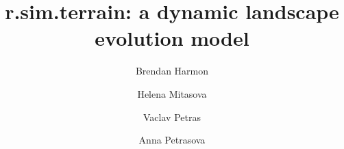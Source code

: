 \documentclass[final,3p,times,twocolumn]{elsarticle}
\begin{document}
\begin{frontmatter}

\title{\lowercase{r.sim.terrain}: a dynamic landscape evolution model} %

\author[la]{Brendan Harmon}

\author[cga,meas]{Helena Mitasova}

\author[cga,meas]{Vaclav Petras}

\author[cga,meas]{Anna Petrasova}

\address[cga]{Center for Geospatial Analytics, North Carolina State University, Raleigh, North Carolina, United States of America}
\address[la]{Robert Reich School of Landscape Architecture, Louisiana State University, Baton Rouge, Louisiana}
\address[meas]{Department of Marine, Earth, and Atmospheric Sciences, North Carolina State University, Raleigh, North Carolina, United States of America}


\end{frontmatter}
\end{document}
